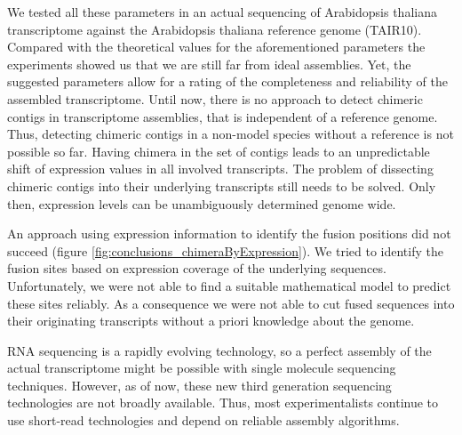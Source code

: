 		We tested all these parameters in an actual sequencing of Arabidopsis thaliana transcriptome against the Arabidopsis thaliana reference genome (TAIR10).
		Compared with the theoretical values for the aforementioned parameters the experiments showed us that we are still far from ideal assemblies.
		Yet, the suggested parameters allow for a rating of the completeness and reliability of the assembled transcriptome.
		Until now, there is no approach to detect chimeric contigs in transcriptome assemblies, that is independent of a reference genome.
		Thus, detecting chimeric contigs in a non-model species without a reference is not possible so far.
		Having chimera in the set of contigs leads to an unpredictable shift of expression values in all involved transcripts.
		The problem of dissecting chimeric contigs into their underlying transcripts still needs to be solved.
		Only then, expression levels can be unambiguously determined genome wide.
		
		An approach using expression information to identify the fusion positions did not succeed (figure \ref{fig:conclusions_chimeraByExpression}).
		We tried to identify the fusion sites based on expression coverage of the underlying sequences.
		Unfortunately, we were not able to find a suitable mathematical model to predict these sites reliably.
		As a consequence we were not able to cut fused sequences into their originating transcripts without a priori knowledge about the genome.

		RNA sequencing is a rapidly evolving technology, so a perfect assembly of the actual transcriptome might be possible with single molecule sequencing techniques.
		However, as of now, these new third generation sequencing technologies are not broadly available.
		Thus, most experimentalists continue to use short-read technologies and depend on reliable assembly algorithms.
		
